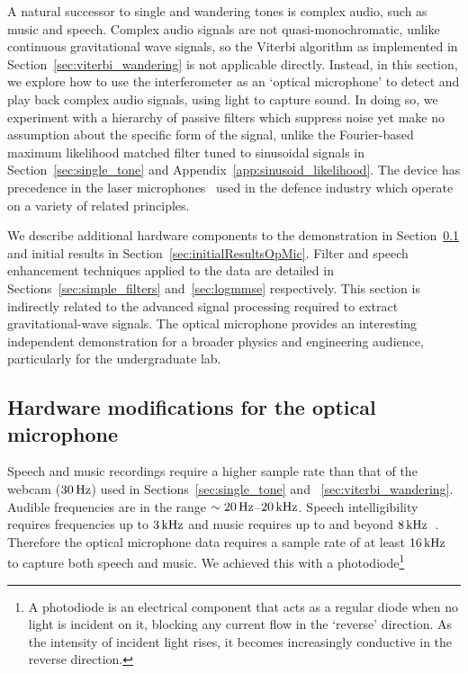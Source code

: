 \documentclass[paper-main.tex]{subfiles}
\begin{document}
A natural successor to single and wandering tones is complex audio, such as music and speech. 
Complex audio signals are not quasi-monochromatic, unlike continuous gravitational wave signals, so the Viterbi algorithm as implemented in Section~\ref{sec:viterbi_wandering} is not applicable directly.
Instead, in this section, we explore how to use the interferometer as an `optical microphone' to detect and play back complex audio signals, using light to capture sound. 
In doing so, we experiment with a hierarchy of passive filters which suppress noise yet make no assumption about the specific form of the signal, unlike the Fourier-based maximum likelihood matched filter tuned to sinusoidal signals in Section~\ref{sec:single_tone} and Appendix~\ref{app:sinusoid_likelihood}. 
The device has precedence in the laser microphones~\cite{laser_microphone} used in the defence industry which operate on a variety of related principles.


We describe additional hardware components to the demonstration in Section~\ref{sec:photodiode} and initial results in Section~\ref{sec:initialResultsOpMic}.
Filter and speech enhancement techniques applied to the data are detailed in Sections~\ref{sec:simple_filters} and~\ref{sec:logmmse} respectively.
This section is indirectly related to the advanced signal processing required to extract gravitational-wave signals. 
The optical microphone provides an interesting independent demonstration for a broader physics and engineering audience, particularly for the undergraduate lab. 



\subsection{Hardware modifications for the optical microphone}
\label{sec:photodiode}

Speech and music recordings require a higher sample rate than that of the webcam ($30\,{\rm Hz}$) used in Sections~\ref{sec:single_tone} and ~\ref{sec:viterbi_wandering}. 
Audible frequencies are in the range $\sim 20\,{\rm Hz}$--$20\,{\rm kHz}$. 
Speech intelligibility requires frequencies up to $3\,{\rm kHz}$ and music requires up to and beyond $8\,{\rm kHz}$~\cite{speech_intelligibility}. 
Therefore the optical microphone data requires a sample rate of at least $16\,{\rm kHz}$ to capture both speech and music. 
We achieved this with a photodiode\footnote{
A photodiode is an electrical component that acts as a regular diode when no light is incident on it, blocking any current flow in the `reverse' direction.
As the intensity of incident light rises, it becomes increasingly conductive in the reverse direction.
} 
\end{document}
